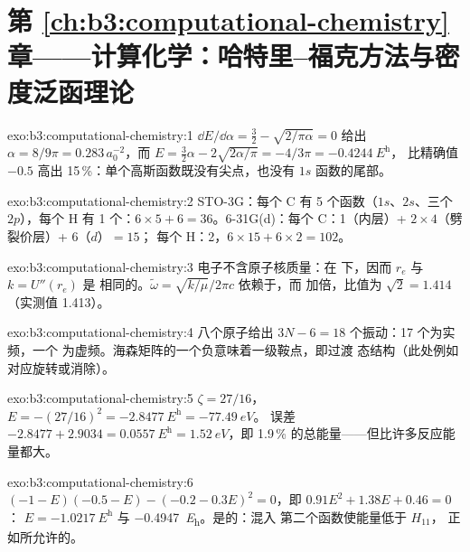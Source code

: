 \section*{第 \ref{ch:b3:computational-chemistry} 章——计算化学：哈特里–福克方法与密度泛函理论}

\begin{solution}{exo:b3:computational-chemistry:1}
$\dd E/\dd\alpha = \frac32 - \sqrt{2/\pi\alpha} = 0$ 给出 $\alpha = 8/9\pi = 0.283\,
a_0^{-2}$，而 $E = \frac32\alpha - 2\sqrt{2\alpha/\pi} = -4/3\pi = \qty{-0.4244}{\hartree}$，
比精确值 $-0.5$ 高出 15\,\%：单个高斯函数既没有尖点，也没有
$1s$ 函数的尾部。
\end{solution}

\begin{solution}{exo:b3:computational-chemistry:2}
STO-3G：每个 C 有 5 个函数（$1s$、$2s$、三个 $2p$），每个 H 有 1 个：$6 \times 5 + 6 =
36$。6-31G(d)：每个 C：1（内层）+ $2 \times 4$（劈裂价层）+ 6（$d$）$= 15$；
每个 H：2，$6 \times 15 + 6 \times 2 = 102$。
\end{solution}

\begin{solution}{exo:b3:computational-chemistry:3}
电子不含原子核质量：在
下，因而 $r_e$ 与 $k = U''(r_e)$ 是
相同的。$\tilde\omega = \sqrt{k/\mu}/2\pi c$ 依赖于，而
加倍，比值为 $\sqrt2 = 1.414$（实测值 1.413）。
\end{solution}

\begin{solution}{exo:b3:computational-chemistry:4}
八个原子给出 $3N - 6 = 18$ 个振动：17 个为实频，一个
为虚频。海森矩阵的一个负意味着一级鞍点，即过渡
态结构（此处例如对应旋转或消除）。
\end{solution}

\begin{solution}{exo:b3:computational-chemistry:5}
$\zeta = 27/16$，$E = -(27/16)^2 = \qty{-2.8477}{\hartree} = \qty{-77.49}{eV}$。
误差 $-2.8477 + 2.9034 = \qty{0.0557}{\hartree} = \qty{1.52}{eV}$，即
1.9\,\% 的总能量——但比许多反应能量都大。
\end{solution}

\begin{solution}{exo:b3:computational-chemistry:6}
$(-1 - E)(-0.5 - E) - (-0.2 - 0.3E)^2 = 0$，即 $0.91E^2 + 1.38E + 0.46 = 0$：
$E = \qty{-1.0217}{\hartree}$ 与 \qty{-0.4947}{\hartree}。是的：混入
第二个函数使能量低于 $H_{11}$，
正如所允许的。
\end{solution}

